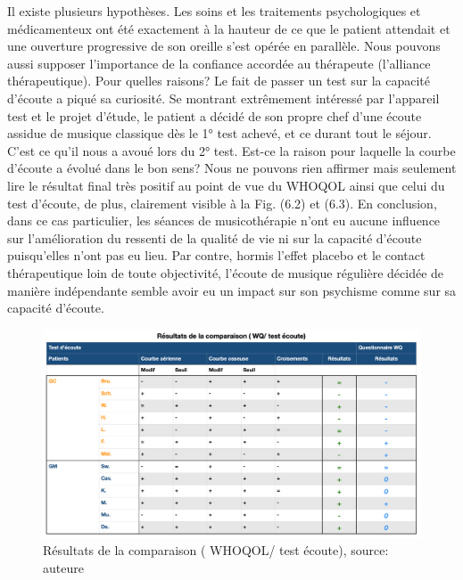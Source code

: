    Il existe plusieurs hypothèses. %
   Les soins et les traitements psychologiques et médicamenteux ont été  
   exactement à la 
   hauteur de ce que le patient attendait et une ouverture progressive de son oreille s'est opérée en 
   parallèle.
   Nous pouvons aussi supposer l'importance de la confiance accordée au thérapeute (l'alliance 
   thérapeutique). 
     Pour quelles raisons? Le fait de passer un test sur la capacité d'écoute a piqué sa curiosité. Se 
     montrant extrêmement intéressé par l'appareil test et le projet d'étude, le 
     patient a %
  décidé  de son propre chef d'une écoute assidue de musique classique dès le 1° test achevé,  
  et ce durant tout le séjour. C'est ce qu'il nous a avoué lors du 2° test.
   Est-ce la raison pour laquelle la courbe d'écoute a évolué dans le bon sens? Nous ne pouvons rien 
   affirmer mais seulement lire le résultat final 
  très positif au point de 
  vue du WHOQOL ainsi que celui du test 
  d'écoute, de plus, clairement visible à la  Fig. (6.2) et (6.3).
  En conclusion, dans ce cas particulier, les séances de musicothérapie n'ont eu aucune  
  influence sur 
  l'amélioration du ressenti de la qualité de vie ni sur la capacité d'écoute puisqu'elles n'ont pas eu lieu. 
  Par contre, hormis l'effet placebo et le contact 
  thérapeutique loin de toute objectivité, l'écoute de musique régulière 
  décidée de manière indépendante semble avoir eu un impact sur son psychisme comme sur sa capacité 
  d'écoute.
 
   \begin{figure}
  	\centering
  	\includegraphics[width=0.7\columnwidth]{images/graphiques/comparaison_pre_post.png}
  	\caption[Résultats de la comparaison ( WHOQOL/ test écoute)]{Résultats de la comparaison ( 
  		WHOQOL/ test 
  		écoute), source: auteure}
  	 \end{figure}
  
